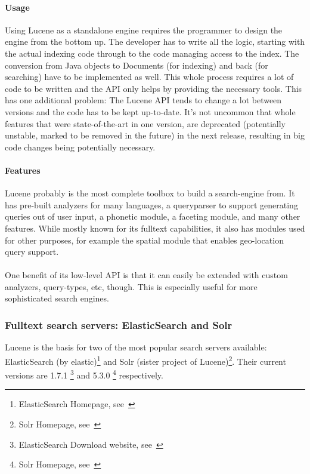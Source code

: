 \paragraph{Usage}
Using Lucene as a standalone engine requires the programmer to design the engine from the bottom up. The developer has to write all the logic, starting with the actual indexing code through to the code managing access to the index. The conversion from Java objects to Documents (for indexing) and back (for searching) have to be implemented as well. This whole process requires a lot of code to be written and the API only helps by providing the necessary tools. This has one additional problem: The Lucene API tends to change a lot between versions and the code has to be kept up-to-date. It's not uncommon that whole features that were state-of-the-art in one version, are deprecated (potentially unstable, marked to be removed in the future) in the next release, resulting in big code changes being potentially necessary.

\paragraph{Features}
Lucene probably is the most complete toolbox to build a search-engine from. It has pre-built analyzers for many languages, a queryparser to support generating queries out of user input, a phonetic module, a faceting module, and many other features. While mostly known for its fulltext capabilities, it also has modules used for other purposes, for example the spatial module that enables geo-location query support.
\\\\
One benefit of its low-level API is that it can easily be extended with custom analyzers, query-types, etc, though. This is especially useful for more sophisticated search engines.

\pagebreak

\subsubsection{Fulltext search servers: ElasticSearch and Solr}
Lucene is the basis for two of the most popular search servers available: ElasticSearch (by elastic)\footnote{ElasticSearch Homepage, see~\cite{elasticsearch_homepage}} and Solr (sister project of Lucene)\footnote{Solr Homepage, see~\cite{solr_homepage}}. Their current versions are 1.7.1 \footnote{ElasticSearch Download website, see~\cite{elasticsearch_downloads_website}} and 5.3.0 \footnote{Solr Homepage, see~\cite{solr_homepage}} respectively.

